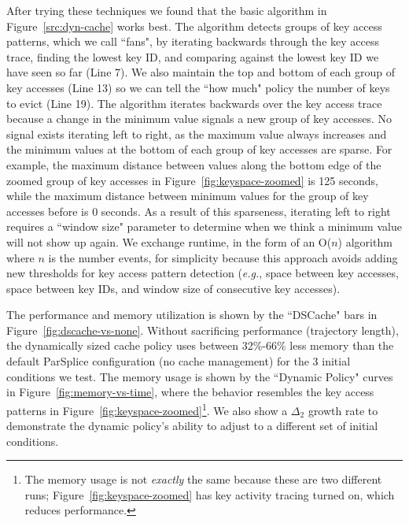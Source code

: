 After trying these techniques we found that the basic algorithm in
Figure~\ref{src:dyn-cache} works best. The algorithm detects groups of key
access patterns, which we call ``fans", by iterating backwards through the key
access trace, finding the lowest key ID, and comparing against the lowest key
ID we have seen so far (Line 7). We also maintain the top and bottom of each
group of key accesses (Line 13) so we can tell the ``how much" policy the
number of keys to evict (Line 19).  The algorithm iterates backwards over the
key access trace because a change in the minimum value signals a new group of
key accesses. No signal exists iterating left to right, as the maximum value
always increases and the minimum values at the bottom of each group of key
accesses are sparse.  For example, the maximum distance between values along
the bottom edge of the zoomed group of key accesses in
Figure~\ref{fig:keyspace-zoomed} is 125 seconds, while the maximum distance
between minimum values for the group of key accesses before is 0 seconds. As a
result of this sparseness, iterating left to right requires a ``window size"
parameter to determine when we think a minimum value will not show up again.
We exchange runtime, in the form of an O(\(n\)) algorithm where \(n\) is the
number events, for simplicity because this approach avoids adding new
thresholds for key access pattern detection ({\it e.g.}, space between key
accesses, space between key IDs, and window size of consecutive key accesses).

The performance and memory utilization is shown by the ``DSCache" bars in
Figure~\ref{fig:dscache-vs-none}. Without sacrificing performance (trajectory
length), the dynamically sized cache policy uses between 32\%-66\% less memory
than the default ParSplice configuration (no cache management) for the 3
initial conditions we test. The memory usage is shown by the ``Dynamic Policy"
curves in Figure~\ref{fig:memory-vs-time}, where the behavior resembles the key
access patterns in Figure~\ref{fig:keyspace-zoomed}\footnote{The memory usage
is not {\it exactly} the same because these are two different runs;
Figure~\ref{fig:keyspace-zoomed} has key activity tracing turned on, which
reduces performance.}.  We also show a \(\Delta_2\) growth rate to demonstrate
the dynamic policy's ability to adjust to a different set of initial
conditions.

